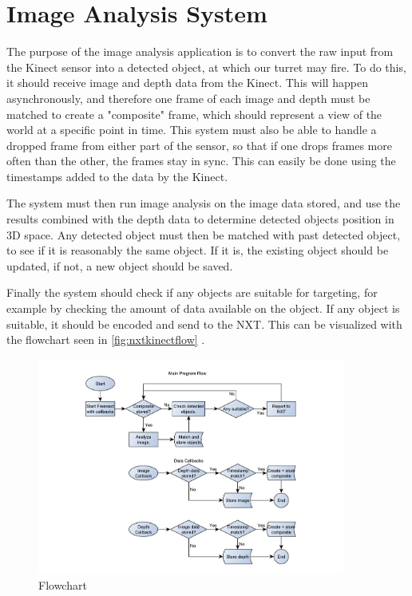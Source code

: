 \section{Image Analysis System}

\label{image_analysis_design}

The purpose of the image analysis application is to convert the raw input from the Kinect sensor into a detected
object, at which our turret may fire. To do this, it should receive image and depth data from the Kinect.
This will happen asynchronously, and therefore one frame of each image and depth must be matched to create a
"composite" frame, which should represent a view of the world at a specific point in time. This system must
also be able to handle a dropped frame from either part of the sensor, so that if one drops frames more
often than the other, the frames stay in sync. This can easily be done using the timestamps added to the data
by the Kinect.

The system must then run image analysis on the image data stored, and use the results combined with the depth
data to determine detected objects position in 3D space. Any detected object must then be matched with past
detected object, to see if it is reasonably the same object. If it is, the existing object should be updated,
if not, a new object should be saved.

Finally the system should check if any objects are suitable for targeting, for example by checking the amount of
data available on the object. If any object is suitable, it should be encoded and send to the NXT.
This can be visualized with the flowchart seen in \autoref{fig:nxtkinectflow} .

\begin{figure}[hbtp]
\includegraphics[width=0.90\textwidth]{img/nxtkinectflow.pdf}
\caption{Flowchart} 
\label{fig:nxtkinectflow} 
\end{figure}

